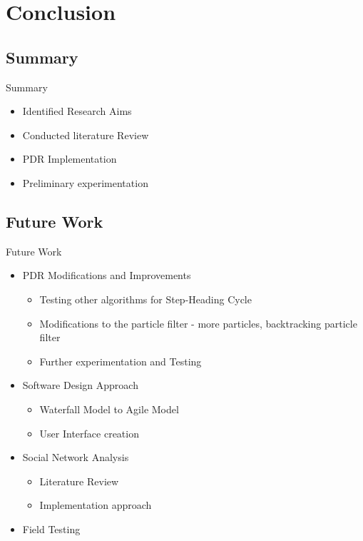 \section{Conclusion} \label{sec:conclusion} %

\subsection{Summary} \label{ssec:conclusion_summary}
\begin{frame}{Summary}
	
	\begin{itemize}[<+-| alert@+>]
		\item Identified Research Aims
		\item Conducted literature Review
		\item PDR Implementation
		\item Preliminary experimentation
	\end{itemize}

\end{frame}

\subsection{Future Work} \label{ssec:conclusion_future}
\begin{frame}{Future Work}
	
	\begin{itemize}[<+-| alert@+>]
		\item PDR Modifications and Improvements
		\begin{itemize}
			\item Testing other algorithms for Step-Heading Cycle
			\item Modifications to the particle filter - more particles, backtracking particle filter
			\item Further experimentation and Testing
		\end{itemize}
		\item Software Design Approach
		\begin{itemize}
			\item Waterfall Model to Agile Model
			\item User Interface creation
		\end{itemize}
		\item Social Network Analysis
		\begin{itemize}
			\item Literature Review
			\item Implementation approach
		\end{itemize}
		\item Field Testing
	\end{itemize}
	

\end{frame}